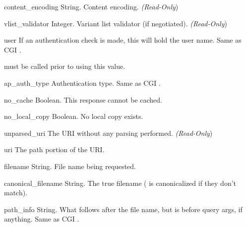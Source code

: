 \begin{memberdesc}[request]{content_encoding}
  String. Content encoding.
  \emph{(Read-Only})
\end{memberdesc}

\begin{memberdesc}[request]{vlist_validator}
  Integer. Variant list validator (if negotiated).
  \emph{(Read-Only})
\end{memberdesc}

\begin{memberdesc}[request]{user}
  If an authentication check is made, this will hold the user
  name. Same as CGI .
  \begin{notice}
     must be called prior to using this value.
  \end{notice}
\end{memberdesc}

\begin{memberdesc}[request]{ap_auth_type}
  Authentication type. Same as CGI .
\end{memberdesc}

\begin{memberdesc}[request]{no_cache}
  Boolean. This response cannot be cached.
\end{memberdesc}

\begin{memberdesc}[request]{no_local_copy}
  Boolean. No local copy exists.
\end{memberdesc}

\begin{memberdesc}[request]{unparsed_uri}
  The URI without any parsing performed.
  \emph{(Read-Only})
\end{memberdesc}

\begin{memberdesc}[request]{uri}
  The path portion of the URI.
\end{memberdesc}

\begin{memberdesc}[request]{filename}
  String. File name being requested.
\end{memberdesc}

\begin{memberdesc}[request]{canonical_filename}
  String. The true filename ( is canonicalized if
  they don't match).
\end{memberdesc}

\begin{memberdesc}[request]{path_info}
  String. What follows after the file name, but is before query args, if
  anything. Same as CGI .
\end{memberdesc}

